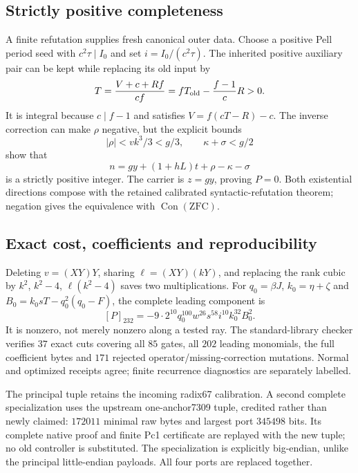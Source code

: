 \subsection{Strictly positive completeness}
A finite refutation supplies fresh canonical outer data.  Choose a
positive Pell period seed with $c^2\tau\mid I_0$ and set
$i=I_0/(c^2\tau)$.  The inherited positive auxiliary pair can be kept
while replacing its old input by
\[
 T=\frac{V+c+Rf}{cf}
   =fT_{\rm old}-\frac{f-1}{c}R>0.
\]
It is integral because $c\mid f-1$ and satisfies $V=f(cT-R)-c$.
The inverse correction can make $\rho$ negative, but the explicit bounds
\[
 |\rho|<vk^3/3<g/3,\qquad
 \kappa+\sigma<g/2
\]
show that
\[
 n=gy+(1+hL)t+\rho-\kappa-\sigma
\]
is a strictly positive integer.  The carrier is $z=gy$, proving $P=0$.
Both existential directions compose with the retained calibrated
syntactic-refutation theorem; negation gives the equivalence with
$\operatorname{Con}(\mathrm{ZFC})$.

\subsection{Exact cost, coefficients and reproducibility}
Deleting $v=(XY)Y$, sharing $\ell=(XY)(kY)$, and replacing the rank
cubic by $k^2$, $k^2-4$, $\ell(k^2-4)$ saves two multiplications.
For $q_0=\beta J$, $k_0=\eta+\zeta$ and
$B_0=k_0sT-q_0^2(q_0-F)$, the complete leading component is
\[
 [P]_{232}=-9\cdot2^{10}q_0^{100}w^{26}s^{58}i^{10}k_0^{32}B_0^2.
\]
It is nonzero, not merely nonzero along a tested ray.  The standard-library
checker verifies $37$ exact cuts covering all $85$ gates, all $202$
leading monomials, the full coefficient bytes and $171$ rejected
operator/missing-correction mutations.  Normal and optimized receipts
agree; finite recurrence diagnostics are separately labelled.

The principal tuple retains the incoming radix67 calibration.  A second
complete specialization uses the upstream one-anchor7309 tuple, credited
rather than newly claimed: $172011$ minimal raw bytes and largest port
$345498$ bits.  Its complete native proof and finite Pc1 certificate are
replayed with the new tuple; no old controller is substituted.  The
specialization is explicitly big-endian, unlike the principal
little-endian payloads.  All four ports are replaced together.

